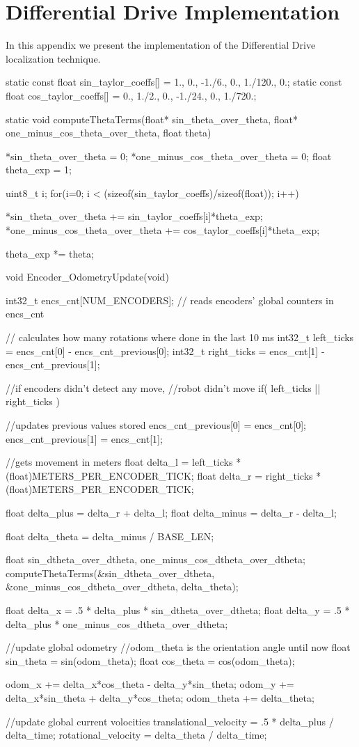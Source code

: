 \chapter{Differential Drive Implementation}\label{diff_drive_implementation}

In this appendix we present the implementation of the Differential Drive localization technique.

\begin{ccode}
	static const float sin_taylor_coeffs[] = {1., 0., -1./6., 0., 1./120., 0.};
	static const float cos_taylor_coeffs[] = {0., 1./2., 0., -1./24., 0., 1./720.};

	static void computeThetaTerms(float* sin_theta_over_theta, float* one_minus_cos_theta_over_theta, float theta) {
		*sin_theta_over_theta = 0;
		*one_minus_cos_theta_over_theta = 0;
		float theta_exp = 1;
	
		uint8_t i;
		for(i=0; i < (sizeof(sin_taylor_coeffs)/sizeof(float)); i++) {
			*sin_theta_over_theta += sin_taylor_coeffs[i]*theta_exp;
			*one_minus_cos_theta_over_theta += cos_taylor_coeffs[i]*theta_exp;
		
			theta_exp *= theta;
		}
	}

	void Encoder_OdometryUpdate(void) {
		int32_t encs_cnt[NUM_ENCODERS];
		// reads encoders' global counters in encs_cnt
	
		// calculates how many rotations where done in the last 10 ms
		int32_t left_ticks = encs_cnt[0] - encs_cnt_previous[0];
		int32_t right_ticks = encs_cnt[1] - encs_cnt_previous[1];
	
		//if encoders didn't detect any move,
			//robot didn't move
		if( left_ticks || right_ticks ) {
			//updates previous values stored
			encs_cnt_previous[0] = encs_cnt[0];
			encs_cnt_previous[1] = encs_cnt[1];
		
			//gets movement in meters
			float delta_l = left_ticks * (float)METERS_PER_ENCODER_TICK;
			float delta_r = right_ticks * (float)METERS_PER_ENCODER_TICK;
		
			float delta_plus = delta_r + delta_l;
			float delta_minus = delta_r - delta_l;
		
			float delta_theta = delta_minus / BASE_LEN;
		
			float sin_dtheta_over_dtheta, one_minus_cos_dtheta_over_dtheta;
			computeThetaTerms(&sin_dtheta_over_dtheta, &one_minus_cos_dtheta_over_dtheta, delta_theta);
		
			float delta_x = .5 * delta_plus * sin_dtheta_over_dtheta;
			float delta_y = .5 * delta_plus * one_minus_cos_dtheta_over_dtheta;		
				
			//update global odometry
				//odom_theta is the orientation angle until now
			float sin_theta = sin(odom_theta);
			float cos_theta = cos(odom_theta);
		
			odom_x += delta_x*cos_theta - delta_y*sin_theta;
			odom_y += delta_x*sin_theta + delta_y*cos_theta;
			odom_theta += delta_theta;
		
			//update global current volocities
			translational_velocity = .5 * delta_plus / delta_time;
			rotational_velocity = delta_theta / delta_time;
		}
	}
\end{ccode}
